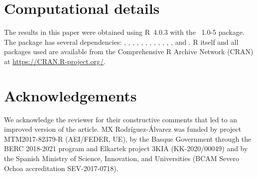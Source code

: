 \section{Computational details}
The results in this paper were obtained using R~4.0.3 with the ~1.0-5 package. The  package has several dependencies: , , , , ,  \citep{moments_package},  \citep{nor1mix_package},  \citep{Matrix_package},  \citep{spatstat_package},  \citep{Hayfield08},  \citep{lattice_package},  \citep{MASS_package}, and  \citep{pbivnorm_package}. R itself and all packages used are available from the Comprehensive R Archive Network (CRAN) at \url{https://CRAN.R-project.org/}.
\section{Acknowledgements}
We acknowledge the reviewer for their constructive comments that led to an improved version of the article. MX Rodr\'iguez-\'Alvarez was funded by project MTM2017-82379-R (AEI/FEDER, UE), by the Basque Government through the BERC 2018-2021 program and Elkartek project 3KIA (KK-2020/00049) and by the Spanish Ministry of Science, Innovation, and Universities (BCAM Severo Ochoa accreditation SEV-2017-0718).



\address{Mar\'ia Xos\'e Rodr\'iguez-\'Alvarez\\
  BCAM - Basque Center for Applied Mathematics and IKERBASQUE, Basque Foundation for Science\\
  Spain\\
  ORCID: 0000-0002-1329-9238\\
 }

\address{Vanda In\'acio\\
  School of Mathematics\\
  University of Edinburgh\\
  Scotland, UK\\
  ORCID: 0000-0001-8084-1616\\
 }

